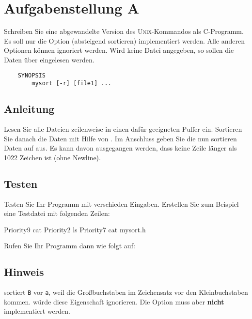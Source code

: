 




\section*{Aufgabenstellung A}
Schreiben Sie eine abgewandelte Version des \textsc{Unix}-Kommandos
 als C-Programm. Es soll nur die Option  (absteigend
sortieren) implementiert werden. Alle anderen Optionen können ignoriert werden.
Wird keine Datei angegeben, so sollen die Daten über 
eingelesen werden.

\begin{verbatim}
    SYNOPSIS
        mysort [-r] [file1] ...
\end{verbatim}

\subsection*{Anleitung}
Lesen Sie alle Dateien zeilenweise in einen dafür geeigneten Puffer ein.
Sortieren Sie danach die Daten mit Hilfe von . Im Anschluss
geben Sie die nun sortieren Daten auf  aus. Es kann davon
ausgegangen werden, dass keine Zeile länger als 1022 Zeichen ist (ohne Newline).

\subsection*{Testen}
Testen Sie Ihr Programm mit verschieden Eingaben. Erstellen Sie zum Beispiel
eine Testdatei  mit folgenden Zeilen:

\begin{osuefmtcode}
  Priority9 cat
  Priority2 ls
  Priority7 cat mysort.h
\end{osuefmtcode}

Rufen Sie Ihr Programm dann wie folgt auf:


\subsection*{Hinweis}
 sortiert \verb+B+ vor \verb+a+, weil
die Großbuchstaben im Zeichensatz vor den Kleinbuchstaben kommen.
 würde diese Eigenschaft ignorieren.
Die Option  muss aber \textbf{nicht} implementiert werden.

\osueguidelinesone


